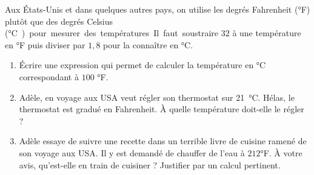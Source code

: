 
\begin{exercice}\label{exosmath-0821}

Aux États-Unis et dans quelques autres pays, on utilise les degrés Fahrenheit (°F) plutôt que des degrés Celsius (\si\degreeCelsius) pour mesurer des températures. Il faut soustraire $32$ à une température en °F puis diviser par $1,8$ pour la connaître en °C.  

\begin{enumerate}
    \item
        Écrire une expression qui permet de calculer la température en °C correspondant à \( 100 \) °F.
    \item
        Adèle, en voyage aux USA veut régler son thermostat sur \SI{21}{\degreeCelsius}. Hélas, le thermostat est gradué en Fahrenheit. À quelle température doit-elle le régler ?
    \item
        Adèle essaye de suivre une recette dans un terrible livre de cuisine ramené de son voyage aux USA. Il y est demandé de chauffer de l'eau à \( 212\)°F. À votre avis, qu'est-elle en train de cuisiner ? Justifier par un calcul pertinent.
\end{enumerate}

\end{exercice}
